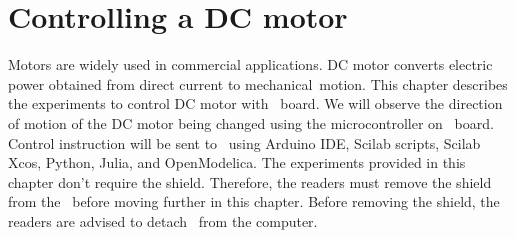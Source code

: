 \chapter{Controlling a DC motor}
\thispagestyle{empty}
\label{dcmotor}
\newcommand{\LocDCMfig}{\Origin/user-code/dcmotor/figures}
\newcommand{\LocDCMscicode}{\Origin/user-code/dcmotor/scilab}
\newcommand{\LocDCMscibrief}[1]{{\tt \seqsplit{
        Origin/user-code/dcmotor/scilab/#1}},
  see \fnrefp{fn:file-loc}}
\newcommand{\LocDCMardcode}{\Origin/user-code/dcmotor/arduino}
\newcommand{\LocDCMardbrief}[1]{{\tt \seqsplit{
        Origin/user-code/dcmotor/arduino/#1}},
  see \fnrefp{fn:file-loc}}

\newcommand{\LocDCMpycode}{\Origin/user-code/dcmotor/python}
\newcommand{\LocDCMpybrief}[1]{{\tt \seqsplit{
        Origin/user-code/dcmotor/python/#1}},
  see \fnrefp{fn:file-loc}}

\newcommand{\LocDCMjuliacode}{\Origin/user-code/dcmotor/julia}
\newcommand{\LocDCMjuliabrief}[1]{{\tt \seqsplit{
        Origin/user-code/dcmotor/julia/#1}},
  see \fnrefp{fn:file-loc}}

\newcommand{\LocDCMOpenModelicacode}{\Origin/user-code/dcmotor/OpenModelica}  %
\newcommand{\LocDCMOpenModelicabrief}[1]{{\tt \seqsplit{%
        Origin/user-code/led/OpenModelica/#1}}, see \fnrefp{fn:file-loc}} %


Motors are widely used in commercial applications. 
DC motor converts electric power obtained from direct current to 
mechanical motion. This chapter describes the experiments to 
control DC motor with \arduino\ board. We will observe the 
direction of motion of the DC motor being changed 
using the microcontroller on \arduino\ board. 
Control instruction will be sent to \arduino\ using Arduino IDE, 
Scilab scripts, Scilab Xcos, Python, Julia, and OpenModelica. 
The experiments provided in this chapter don't require the shield. 
Therefore, the readers must remove the shield from the \arduino\ before 
moving further in this chapter. Before removing the shield, 
the readers are advised to detach \arduino\ from the computer. 

